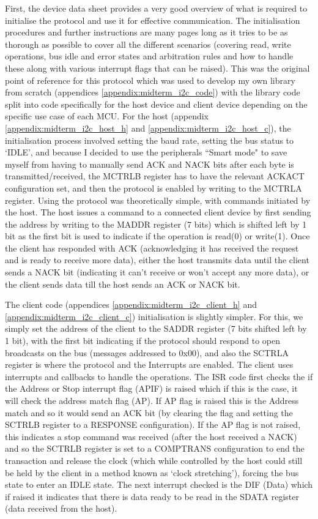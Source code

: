 \documentclass[11pt,a4paper,titlepage]{report}
\begin{document}
	First, the device data sheet\cite{ATTINY1627} provides a very good overview of what is required to initialise the protocol and use it for effective communication. The initialisation procedures and further instructions are many pages long as it tries to be as thorough as possible to cover all the different scenarios (covering read, write operations, bus idle and error states and arbitration rules and how to handle these along with various interrupt flags that can be raised). This was the original point of reference for this protocol which was used to develop my own library from scratch (appendices \ref{appendix:midterm_i2c_code}) with the library code split into code specifically for the host device and client device depending on the specific use case of each MCU. For the host (appendix \ref{appendix:midterm_i2c_host_h} and \ref{appendix:midterm_i2c_host_c}), the initialisation process involved setting the baud rate, setting the bus status to `IDLE', and because I decided to use the peripherals ``Smart mode" to save myself from having to manually send ACK and NACK bits after each byte is transmitted/received, the MCTRLB register has to have the relevant ACKACT configuration set, and then the protocol is enabled by writing to the MCTRLA register. Using the protocol was theoretically simple, with commands initiated by the host. The host issues a command to a connected client device by first sending the address by writing to the MADDR register (7 bits) which is shifted left by 1 bit as the first bit is used to indicate if the operation is read(0) or write(1). Once the client has responded with ACK (acknowledging it has received the request and is ready to receive more data), either the host transmits data until the client sends a NACK bit (indicating it can't receive or won't accept any more data), or the client sends data till the host sends an ACK or NACK bit. 
	
	 The client code (appendices \ref{appendix:midterm_i2c_client_h} and \ref{appendix:midterm_i2c_client_c}) initialisation is slightly simpler. For this, we simply set the address of the client to the SADDR register (7 bits shifted left by 1 bit), with the first bit indicating if the protocol should respond to open broadcasts on the bus (messages addressed to 0x00), and also the SCTRLA register is where the protocol and the Interrupts are enabled. The client uses interrupts and callbacks to handle the operations. The ISR code first checks the if the Address or Stop interrupt flag (APIF) is raised which if this is the case, it will check the address match flag (AP). If AP flag is raised this is the Address match and so it would send an ACK bit (by clearing the flag and setting the SCTRLB register to a RESPONSE configuration). If the AP flag is not raised, this indicates a stop command was received (after the host received a NACK) and so the SCTRLB register is set to a COMPTRANS configuration to end the transaction and release the clock (which while controlled by the host could still be held by the client in a method known as `clock stretching'), forcing the bus state to enter an IDLE state.  The next interrupt checked is the DIF (Data) which if raised it indicates that there is data ready to be read in the SDATA register (data received from the host). 
	 
\end{document}
